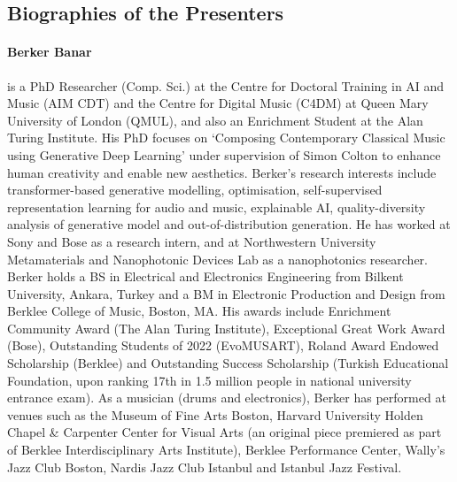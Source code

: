 \subsection*{Biographies of the Presenters}
\paragraph{Berker Banar} is a PhD Researcher (Comp. Sci.) at the Centre for Doctoral Training in AI and Music (AIM CDT) and the Centre for Digital Music (C4DM) at Queen Mary University of London (QMUL), and also an Enrichment Student at the Alan Turing Institute. His PhD focuses on `Composing Contemporary Classical Music using Generative Deep Learning' under supervision of Simon Colton to enhance human creativity and enable new aesthetics. Berker's research interests include transformer-based generative modelling, optimisation, self-supervised representation learning for audio and music, explainable AI, quality-diversity analysis of generative model and out-of-distribution generation. He has worked at Sony and Bose as a research intern, and at Northwestern University Metamaterials and Nanophotonic Devices Lab as a nanophotonics researcher. Berker holds a BS in Electrical and Electronics Engineering from Bilkent University, Ankara, Turkey and a BM in Electronic Production and Design from Berklee College of Music, Boston, MA. His awards include Enrichment Community Award (The Alan Turing Institute), Exceptional Great Work Award (Bose), Outstanding Students of 2022 (EvoMUSART), Roland Award Endowed Scholarship (Berklee) and Outstanding Success Scholarship (Turkish Educational Foundation, upon ranking 17th in 1.5 million people in national university entrance exam). As a musician (drums and electronics), Berker has performed at venues such as the Museum of Fine Arts Boston, Harvard University Holden Chapel \& Carpenter Center for Visual Arts (an original piece premiered as part of Berklee Interdisciplinary Arts Institute), Berklee Performance Center, Wally's Jazz Club Boston, Nardis Jazz Club Istanbul and Istanbul Jazz Festival.

